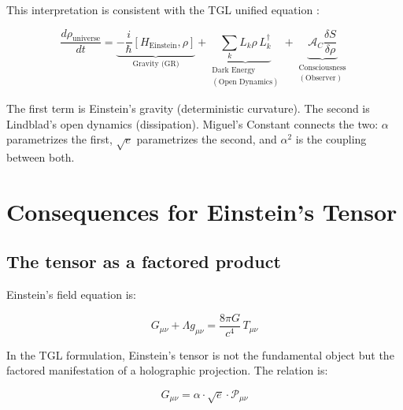 \documentclass[12pt,a4paper,twoside]{article}
\newcommand{\alphaii}{\alpha^{2}}
\begin{document}
This interpretation is consistent with the TGL unified equation \cite{Miguel2026Fronteira}:

\begin{equation}
\frac{d\rho_{\text{universe}}}{dt} = \underbrace{-\frac{i}{\hbar}[H_{\text{Einstein}}, \rho]}_{\text{Gravity (GR)}} + \underbrace{\sum_k L_k\rho\, L_k^\dagger}_{\substack{\text{Dark Energy}\\(\text{Open Dynamics})}} + \underbrace{\mathcal{A}_C\frac{\delta S}{\delta\rho}}_{\substack{\text{Consciousness}\\(\text{Observer})}}
\end{equation}

The first term is Einstein's gravity (deterministic curvature). The second is Lindblad's open dynamics (dissipation). Miguel's Constant connects the two: $\alpha$ parametrizes the first, $\sqrt{e}$ parametrizes the second, and $\alphaii$ is the coupling between both.



\section{Consequences for Einstein's Tensor}
\label{sec:tensor}

\subsection{The tensor as a factored product}

Einstein's field equation is:

\begin{equation}
G_{\mu\nu} + \Lambda g_{\mu\nu} = \frac{8\pi G}{c^4}\, T_{\mu\nu}
\label{eq:einstein}
\end{equation}

In the TGL formulation, Einstein's tensor is not the fundamental object but the factored manifestation of a holographic projection. The relation is:

\begin{equationbox}[title={Factored Tensor}]
\begin{equation}
\boxed{G_{\mu\nu} = \alpha \cdot \sqrt{e} \cdot \mathcal{P}_{\mu\nu}}
\label{eq:tensor_fatorado}
\end{equation}
\end{equationbox}
\end{document}
